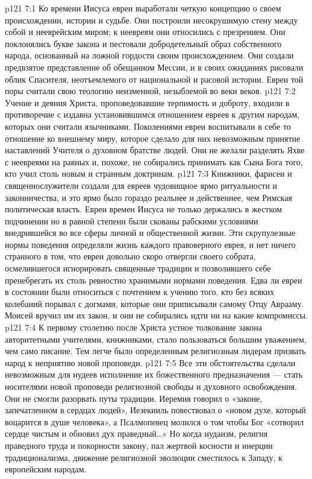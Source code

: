 \vs p121 7:1 Ко времени Иисуса евреи выработали четкую концепцию о своем происхождении, истории и судьбе. Они построили несокрушимую стену между собой и нееврейским миром; к неевреям они относились с презрением. Они поклонялись букве закона и пестовали добродетельный образ собственного народа, основанный на ложной гордости своим происхождением. Они создали предвзятое представление об обещанном Мессии, и в своих ожиданиях рисовали облик Спасителя, неотъемлемого от национальной и расовой истории. Евреи той поры считали свою теологию неизменной, незыблемой во веки веков.
\vs p121 7:2 Учение и деяния Христа, проповедовавшие терпимость и доброту, входили в противоречие с издавна установившимся отношением евреев к другим народам, которых они считали язычниками. Поколениями евреи воспитывали в себе то отношение ко внешнему миру, которое сделало для них невозможным принятие наставлений Учителя о духовном братстве людей. Они не желали разделять Яхве с неевреями на равных и, похоже, не собирались принимать как Сына Бога того, кто учил столь новым и странным доктринам.
\vs p121 7:3 Книжники, фарисеи и священнослужители создали для евреев чудовищное ярмо ритуальности и законничества, и это ярмо было гораздо реальнее и действеннее, чем Римская политическая власть. Евреи времен Иисуса не только держались в жестком подчинении  но в равной степени были скованы рабскими условиями  внедрившейся во все сферы личной и общественной жизни. Эти скрупулезные нормы поведения определяли жизнь каждого правоверного еврея, и нет ничего странного в том, что евреи довольно скоро отвергли своего собрата, осмелившегося игнорировать священные традиции и позволившего себе пренебрегать их столь ревностно хранимыми нормами поведения. Едва ли евреи в состоянии были относиться с почтением к учению того, кто без всяких колебаний порывал с догмами, которые они приписывали самому Отцу Аврааму. Моисей вручил им их закон, и они не собирались идти ни на какие компромиссы.
\vs p121 7:4 К первому столетию после Христа устное толкование закона авторитетными учителями, книжниками, стало пользоваться большим уважением, чем само писание. Тем легче было определенным религиозным лидерам призвать народ к неприятию новой проповеди.
\vs p121 7:5 Все эти обстоятельства сделали невозможным для иудеев исполнение их божественного предназначения --- стать носителями новой проповеди религиозной свободы и духовного освобождения. Они не смогли разорвать путы традиции. Иеремия говорил о «законе, запечатленном в сердцах людей», Иезекииль повествовал о «новом духе, который воцарится в душе человека», а Псалмопевец молился о том чтобы Бог «сотворил сердце чистым и обновил дух праведный\ldots » Но когда иудаизм, религия праведного труда и покорности закону, пал жертвой косности и инерции традиционализма, движение религиозной эволюции сместилось к Западу, к европейским народам.
